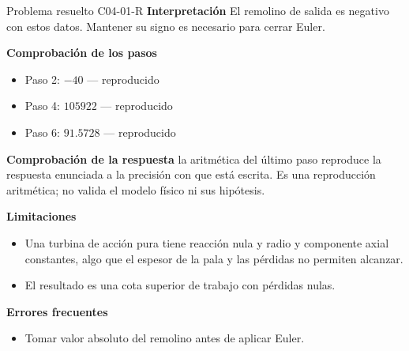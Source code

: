 \documentclass[10pt,openany]{book}
\begin{document}
\begin{studiumworked}{Problema resuelto C04-01-R}
\noindent\textbf{Interpretación}
El remolino de salida es negativo con estos datos. Mantener su signo es necesario para cerrar Euler.

\noindent\textbf{Comprobación de los pasos}
\begin{itemize}
\item Paso 2: $-40$ — reproducido
\item Paso 4: $105922$ — reproducido
\item Paso 6: $91.5728$ — reproducido
\end{itemize}

\noindent\textbf{Comprobación de la respuesta} la aritmética del último paso reproduce la respuesta enunciada a la precisión con que está escrita. Es una reproducción aritmética; no valida el modelo físico ni sus hipótesis.

\noindent\textbf{Limitaciones}
\begin{itemize}
\item Una turbina de acción pura tiene reacción nula y radio y componente axial constantes, algo que el espesor de la pala y las pérdidas no permiten alcanzar.
\item El resultado es una cota superior de trabajo con pérdidas nulas.
\end{itemize}

\noindent\textbf{Errores frecuentes}
\begin{itemize}
\item Tomar valor absoluto del remolino antes de aplicar Euler.
\end{itemize}
\end{studiumworked}
\end{document}

